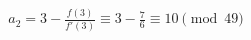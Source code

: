 \documentclass[preview]{standalone}
\begin{document}
\begin{align*}
a_2 = 3 - \frac{f(3)}{f'(3)} \equiv 3 - \frac{7}{6} \equiv 10 \pmod{49}
\end{align*}
\end{document}
